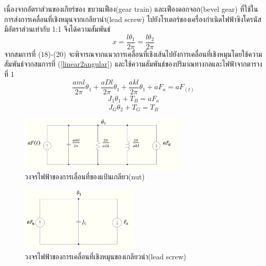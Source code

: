 \documentclass[11pt,a4paper]{article}
\begin{document}
เนื่องจากอัตราส่วนของเกียร์ของ ขบวนเฟือง(gear train) และเฟืองดอกจอก(bevel gear) ที่ใช้ในการส่งการเคลื่อนที่เชิงหมุนจากเกลียวนำ(lead screw) ไปยังโรเตอร์ของเครื่องกำเนิดไฟฟ้าซิงโครนัส มีอัตราส่วนเท่ากับ 1:1 จึงได้ความสัมพันธ์
\begin{equation}\label{linear2angular}
    x = \frac{l\theta_{1}}{2\pi} = \frac{l\theta_{2}}{2\pi}
\end{equation}
จากสมการที่ (18)-(20) จะพิจารณจากแนวการเคลื่อนที่เชิงเส้นไปยังการเคลื่อนที่เชิงหมุนโดยใช้ความสัมพันธ์จากสมการที่ (\ref{linear2angular}) และใช้ความสัมพันธ์ของปริมาณทางกลและไฟฟ้าจากตารางที่ 1
\begin{equation}
    \frac{aml}{2\pi}\ddot{\theta}_{1} + \frac{aDl}{2\pi}\dot{\theta}_{1} + \frac{akl}{2\pi}\theta_{1} + aF_{a} = aF_(t)
\end{equation}
\begin{equation}
    J_{1}\ddot{\theta}_{1} + T_{B} = aF_{a}
\end{equation}
\begin{equation}
    J_{G}\ddot{\theta}_{2} + T_{G} = T_{B}
\end{equation}
\begin{figure}[!htb]
    \begin{center}
        \includegraphics[width=0.7\textwidth]{cir1lx.jpeg}
    \end{center}
    \caption{วงจรไฟฟ้าของการเลื่อนที่ของแป้นเกลียว(nut)}
    \label{cir1lx}
\end{figure}
\begin{figure}[!htb]
    \begin{center}
        \includegraphics[width=0.5\textwidth]{cir2lx.jpg}
    \end{center}
    \caption{วงจรไฟฟ้าของการเคลื่อนที่เชิงหมุนของเกลียวนำ(lead screw)}
    \label{cir2_lx}
\end{figure}
\end{document}

